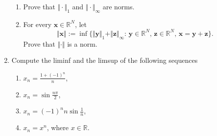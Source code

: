 \documentclass{article}%
\begin{document}
\begin{enumerate}
\begin{enumerate}
\item Prove that $\Vert\cdot\Vert_{1}$ and $\Vert\cdot\Vert_{\infty}$ are norms.

\item For every $\boldsymbol{x}\in\mathbb{R}^{N}$, let%
\[
\Vert\boldsymbol{x}\Vert:=\inf\{\Vert\boldsymbol{y}\Vert_{1}+\Vert
\boldsymbol{z}\Vert_{\infty}:\,\boldsymbol{y}\in\mathbb{R}^{N}%
,\,\boldsymbol{z}\in\mathbb{R}^{N},\,\boldsymbol{x}=\boldsymbol{y}%
+\boldsymbol{z}\}.
\]
Prove that $\Vert\cdot\Vert$ is a norm.
\end{enumerate}

\item Compute the liminf and the limsup of the following sequences

\begin{enumerate}
\item $x_{n}=\frac{1+(-1)^{n}}{n}$,

\item $x_{n}=\sin\frac{n\pi}{2}$,

\item $x_{n}=(-1)^{n}n\sin\frac{1}{n}$,

\item $x_{n}=x^{n}$, where $x\in\mathbb{R}$.
\end{enumerate}
\end{enumerate}
\end{document}
